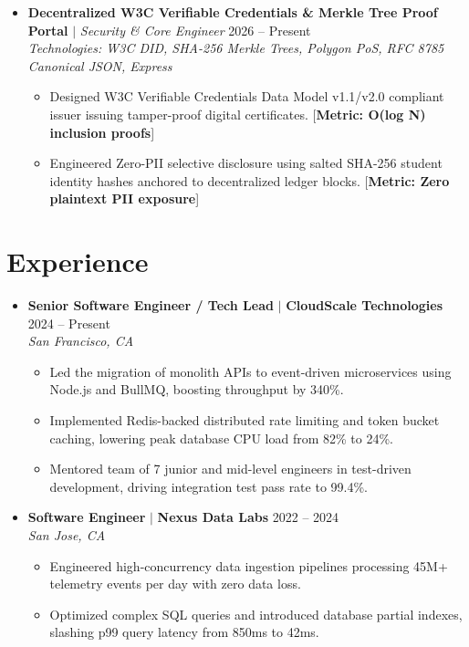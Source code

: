 \documentclass[letterpaper,10pt]{article}
\begin{document}
\begin{itemize}[leftmargin=0.15in, label={}]
  \item
    \textbf{Decentralized W3C Verifiable Credentials \& Merkle Tree Proof Portal} $|$ \textit{Security \& Core Engineer} \hfill \small{2026 – Present} \\
    \textit{\small Technologies: W3C DID, SHA-256 Merkle Trees, Polygon PoS, RFC 8785 Canonical JSON, Express}
    \begin{itemize}[leftmargin=0.2in, label={$\circ$}]
      \item \small{Designed W3C Verifiable Credentials Data Model v1.1/v2.0 compliant issuer issuing tamper-proof digital certificates. [\textbf{Metric: O(log N) inclusion proofs}]}
      \item \small{Engineered Zero-PII selective disclosure using salted SHA-256 student identity hashes anchored to decentralized ledger blocks. [\textbf{Metric: Zero plaintext PII exposure}]}
    \end{itemize}
\end{itemize}

\section{Experience}
\begin{itemize}[leftmargin=0.15in, label={}]
  \item
    \textbf{Senior Software Engineer / Tech Lead} $|$ \textbf{CloudScale Technologies} \hfill \small{2024 – Present} \\
    \textit{\small San Francisco, CA}
    \begin{itemize}[leftmargin=0.2in, label={$\circ$}]
      \item \small{Led the migration of monolith APIs to event-driven microservices using Node.js and BullMQ, boosting throughput by 340\%.}
      \item \small{Implemented Redis-backed distributed rate limiting and token bucket caching, lowering peak database CPU load from 82\% to 24\%.}
      \item \small{Mentored team of 7 junior and mid-level engineers in test-driven development, driving integration test pass rate to 99.4\%.}
    \end{itemize}
  \item
    \textbf{Software Engineer} $|$ \textbf{Nexus Data Labs} \hfill \small{2022 – 2024} \\
    \textit{\small San Jose, CA}
    \begin{itemize}[leftmargin=0.2in, label={$\circ$}]
      \item \small{Engineered high-concurrency data ingestion pipelines processing 45M+ telemetry events per day with zero data loss.}
      \item \small{Optimized complex SQL queries and introduced database partial indexes, slashing p99 query latency from 850ms to 42ms.}
    \end{itemize}
\end{itemize}
\end{document}

